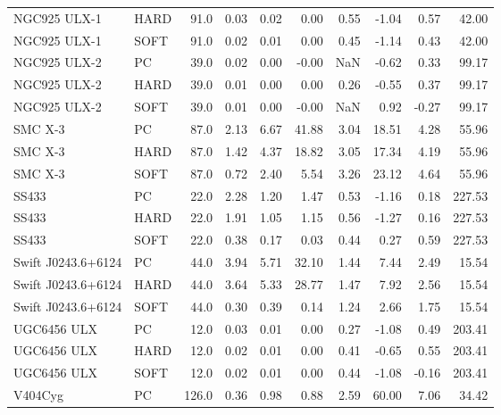 \begin{tabular}{llrrrrrrrr}
      NGC925 ULX-1 &  HARD &   91.0 &  0.03 & 0.02 &      0.00 &   0.55 &     -1.04 &  0.57 &        42.00 \\
      NGC925 ULX-1 &  SOFT &   91.0 &  0.02 & 0.01 &      0.00 &   0.45 &     -1.14 &  0.43 &        42.00 \\
      NGC925 ULX-2 &    PC &   39.0 &  0.02 & 0.00 &     -0.00 &    NaN &     -0.62 &  0.33 &        99.17 \\
      NGC925 ULX-2 &  HARD &   39.0 &  0.01 & 0.00 &      0.00 &   0.26 &     -0.55 &  0.37 &        99.17 \\
      NGC925 ULX-2 &  SOFT &   39.0 &  0.01 & 0.00 &     -0.00 &    NaN &      0.92 & -0.27 &        99.17 \\
           SMC X-3 &    PC &   87.0 &  2.13 & 6.67 &     41.88 &   3.04 &     18.51 &  4.28 &        55.96 \\
           SMC X-3 &  HARD &   87.0 &  1.42 & 4.37 &     18.82 &   3.05 &     17.34 &  4.19 &        55.96 \\
           SMC X-3 &  SOFT &   87.0 &  0.72 & 2.40 &      5.54 &   3.26 &     23.12 &  4.64 &        55.96 \\
             SS433 &    PC &   22.0 &  2.28 & 1.20 &      1.47 &   0.53 &     -1.16 &  0.18 &       227.53 \\
             SS433 &  HARD &   22.0 &  1.91 & 1.05 &      1.15 &   0.56 &     -1.27 &  0.16 &       227.53 \\
             SS433 &  SOFT &   22.0 &  0.38 & 0.17 &      0.03 &   0.44 &      0.27 &  0.59 &       227.53 \\
Swift J0243.6+6124 &    PC &   44.0 &  3.94 & 5.71 &     32.10 &   1.44 &      7.44 &  2.49 &        15.54 \\
Swift J0243.6+6124 &  HARD &   44.0 &  3.64 & 5.33 &     28.77 &   1.47 &      7.92 &  2.56 &        15.54 \\
Swift J0243.6+6124 &  SOFT &   44.0 &  0.30 & 0.39 &      0.14 &   1.24 &      2.66 &  1.75 &        15.54 \\
       UGC6456 ULX &    PC &   12.0 &  0.03 & 0.01 &      0.00 &   0.27 &     -1.08 &  0.49 &       203.41 \\
       UGC6456 ULX &  HARD &   12.0 &  0.02 & 0.01 &      0.00 &   0.41 &     -0.65 &  0.55 &       203.41 \\
       UGC6456 ULX &  SOFT &   12.0 &  0.02 & 0.01 &      0.00 &   0.44 &     -1.08 & -0.16 &       203.41 \\
           V404Cyg &    PC &  126.0 &  0.36 & 0.98 &      0.88 &   2.59 &     60.00 &  7.06 &        34.42 \\

\end{tabular}
